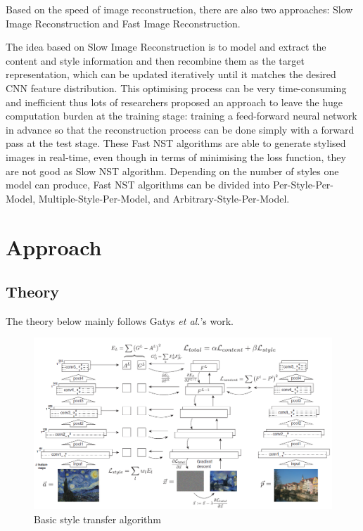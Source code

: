 \documentclass[runningheads]{llncs}
\begin{document}
Based on the speed of image reconstruction, there are also two approaches: Slow Image Reconstruction and Fast Image Reconstruction.

The idea based on Slow Image Reconstruction is to model and extract the content and style information and then recombine them as the target representation, which can be updated iteratively until it matches the desired CNN feature distribution. This optimising process can be very time-consuming and inefficient thus lots of researchers proposed an approach to leave the huge computation burden at the training stage: training a feed-forward neural network in advance so that the reconstruction process can be done simply with a forward pass at the test stage\cite{JohsonJustin2016PLfR}\cite{UlyanovDmitry2016TNFS}. These Fast NST algorithms are able to generate stylised images in real-time, even though in terms of minimising the loss function, they are not good as Slow NST algorithm\cite{jing2017neural}. Depending on the number of styles one model can produce, Fast NST algorithms can be divided into Per-Style-Per-Model\cite{JohsonJustin2016PLfR}\cite{UlyanovDmitry2016TNFS}, Multiple-Style-Per-Model\cite{ZhangHang2017MGNf}\cite{DumoulinVincent2016ALRF}, and Arbitrary-Style-Per-Model\cite{ChenTianQi2016FPST}\cite{GhiasiGolnaz2017Etso}.  
\section{Approach}
\label{sec:theory}
\subsection{Theory}

The theory below mainly follows Gatys \textit{et al.}'s work.

\begin{figure}[h!]
    \centering
    \includegraphics[scale=.4]{neural_style_transfer/img/transfer_algorithm.png}
    \caption{Basic style transfer algorithm}
    \label{fig:algorithm}
\end{figure}
\end{document}
